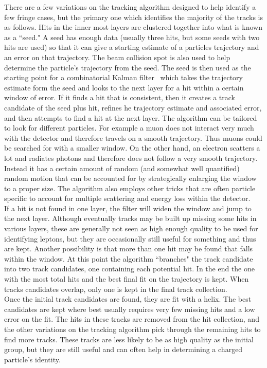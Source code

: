 	There are a few variations on the tracking algorithm designed to help identify a few fringe cases, but the primary one which identifies the majority of the tracks is as follows. Hits in the inner most layers are clustered together into what is known as a ``seed." A seed has enough data (usually three hits, but some seeds with two hits are used) so that it can give a starting estimate of a particles trajectory and an error on that trajectory. The beam collision spot is also used to help determine the particle's trajectory from the seed. The seed is then used as the starting point for a combinatorial Kalman filter~\cite{ckf} which takes the trajectory estimate form the seed and looks to the next layer for a hit within a certain window of error. If it finds a hit that is consistent, then it creates a track candidate of the seed plus hit, refines he trajectory estimate and associated error, and then attempts to find a hit at the next layer. The algorithm can be tailored to look for different particles. For example a muon does not interact very much with the detector and therefore travels on a smooth trajectory. Thus muons could be searched for with a smaller window. On the other hand, an electron scatters a lot and radiates photons and therefore does not follow a very smooth trajectory. Instead it has a certain amount of random (and somewhat well quantified) random motion that can be accounted for by strategically enlarging the window to a proper size. The algorithm also employs other tricks that are often particle specific to account for multiple scattering and energy loss within the detector.\\
	
	If a hit is not found in one layer, the filter will widen the window and jump to the next layer. Although eventually tracks may be built up missing some hits in various layers, these are generally not seen as high enough quality to be used for identifying leptons, but they are occasionally still useful for something and thus are kept. Another possibility is that more than one hit may be found that falls within the window. At this point the algorithm ``branches" the track candidate into two track candidates, one containing each potential hit. In the end the one with the most total hits and the best final fit on the trajectory is kept. When tracks candidates overlap, only one is kept in the final track collection.\\
	
	Once the initial track candidates are found, they are fit with a helix. The best candidates are kept where best usually requires very few missing hits and a low error on the fit. The hits in these tracks are removed from the hit collection, and the other variations on the tracking algorithm pick through the remaining hits to find more tracks. These tracks are less likely to be as high quality as the initial group, but they are still useful and can often help in determining a charged particle's identity.\\
	
